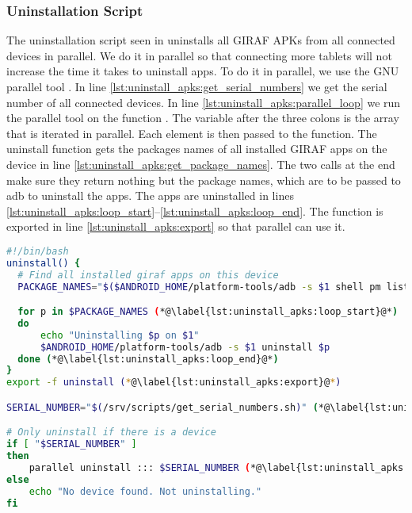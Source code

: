 \subsubsection{Uninstallation Script}
The uninstallation script seen in  uninstalls all GIRAF APKs from all connected devices in parallel. We do it in parallel so that connecting more tablets will not increase the time it takes to uninstall apps. To do it in parallel, we use the GNU parallel tool \parencite{Tange2011a}. In line \ref{lst:uninstall_apks:get_serial_numbers} we get the serial number of all connected devices. In line \ref{lst:uninstall_apks:parallel_loop} we run the parallel tool on the function . The variable  after the three colons is the array that is iterated in parallel. Each element is then passed to the  function. The uninstall function gets the packages names of all installed GIRAF apps on the device in line \ref{lst:uninstall_apks:get_package_names}. The two  calls at the end make sure they return nothing but the package names, which are to be passed to adb to uninstall the apps. The apps are uninstalled in lines \ref{lst:uninstall_apks:loop_start}--\ref{lst:uninstall_apks:loop_end}. The function is exported in line \ref{lst:uninstall_apks:export} so that parallel can use it.
\begin{lstlisting}[float=tbp,language=bash,caption=Bash script that uninstalls all installed GIRAF apps on all devices,label=lst:uninstall_apks]
#!/bin/bash
uninstall() {
  # Find all installed giraf apps on this device
  PACKAGE_NAMES="$($ANDROID_HOME/platform-tools/adb -s $1 shell pm list packages -f | grep dk.aau.cs.giraf | sed 's/.*apk=//' | sed 's/\s*//g')" (*@\label{lst:uninstall_apks:get_package_names}@*)

  for p in $PACKAGE_NAMES (*@\label{lst:uninstall_apks:loop_start}@*)
  do
      echo "Uninstalling $p on $1"
      $ANDROID_HOME/platform-tools/adb -s $1 uninstall $p
  done (*@\label{lst:uninstall_apks:loop_end}@*)
}
export -f uninstall (*@\label{lst:uninstall_apks:export}@*)

SERIAL_NUMBER="$(/srv/scripts/get_serial_numbers.sh)" (*@\label{lst:uninstall_apks:get_serial_numbers}@*)

# Only uninstall if there is a device
if [ "$SERIAL_NUMBER" ]
then
    parallel uninstall ::: $SERIAL_NUMBER (*@\label{lst:uninstall_apks:parallel_loop}@*)
else
    echo "No device found. Not uninstalling."
fi
\end{lstlisting}

